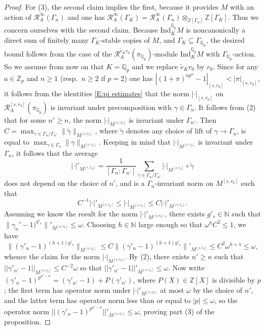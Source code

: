 \documentclass[12pt]{article}
\theoremstyle{definition}
\numberwithin{equation}{theorem}
\newcommand{\calR}{\mathcal{R}}
\newcommand{\QQ}{\mathbb{Q}}
\newcommand{\NN}{\mathbb{N}}
\newcommand{\ZZ}{\mathbb{Z}}
\newcommand{\Ind}{\mathrm{Ind}}
\def\Qp{\QQ_p}
\newcommand{\Zp}{\ZZ_p}
\begin{document}
\begin{proof}
For (3), the second claim implies the first, because it provides $M$
with an action of $\calR_A^\infty(\Gamma_n)$ and one has
$\calR_A^\infty(\Gamma_K) = \calR_A^\infty(\Gamma_n)
\otimes_{\ZZ[\Gamma_n]} \ZZ[\Gamma_K]$.  Thus we concern ourselves
with the second claim.  Because $\Ind_K^{\Qp} M$ is noncanonically a
direct sum of finitely many $\Gamma_K$-stable copies of $M$, and
$\Gamma_K \subseteq \Gamma_{\Qp}$, the desired bound follows from the
case of the $\calR_A^{\tilde e_K r_0}(\pi_{\Qp})$-module $\Ind_K^{\Qp}
M$ with $\Gamma_{\Qp}$-action.  So we assume from now on that $K=\Qp$
and we replace $\tilde e_K r_0$ by $r_0$.  Since for any $a \in \Zp$
and $n \geq 1$ (resp.\ $n \geq 2$ if $p=2$) one has
$|(1+\pi)^{ap^n}-1|_{[s,r_0]} < |\pi|_{[s,r_0]}$, it follows from the
identities \eqref{E:pi estimates} that the norm $|\cdot|_{[s,r_0]}$ on
$\calR_A^{[s,r_0]}(\pi_{\Qp})$ is invariant under precomposition with
$\gamma \in \Gamma_n$.  It follows from (2) that for some $n' \geq n$,
the norm $|\cdot|_{M^{[s,r_0]}}$ is invariant under $\Gamma_{n'}$.
Then $C = \max_{\gamma \in \Gamma_n/\Gamma_{n'}}
\|\tilde\gamma\|_{M^{[s,r_0]}}$, where $\tilde\gamma$ denotes any
choice of lift of $\gamma \to \Gamma_n$, is equal to $\max_{\gamma \in
  \Gamma_n} \|\gamma\|_{M^{[s,r_0]}}$.  Keeping in mind that
$|\cdot|_{M^{[s,r_0]}}$ is invariant under $\Gamma_n$, it follows that
the average
\[
|\cdot|'_{M^{[s,r_0]}}
=
\frac1{[\Gamma_n:\Gamma_{n'}]}
\sum_{\gamma \in \Gamma_n/\Gamma_{n'}} |\cdot|_{M^{[s,r_0]}} \circ \tilde\gamma
\]
does not depend on the choice of $n'$, and is a $\Gamma_n$-invariant
norm on $M^{[s,r_0]}$ such that
\[
C^{-1}|\cdot|'_{M^{[s,r_0]}}
\leq
|\cdot|_{M^{[s,r_0]}}
\leq
C|\cdot|'_{M^{[s,r_0]}}.
\]
Assuming we know the result for the norm $|\cdot|'_{M^{[s,r_0]}}$,
there exists $g'_s \in \NN$ such that
$\|\gamma_n'-1)^{g'_s}\|'_{M^{[s,r_0]}} \leq \omega$.  Choosing $h \in
\NN$ large enough so that $\omega^hC^2 \leq 1$, we have
\[
\|(\gamma'_n-1)^{(h+1)g'_s}\|_{M^{[s,r_0]}}
\leq
C\|(\gamma'_n-1)^{(h+1)g'_s}\|'_{M^{[s,r_0]}}
\leq
C^2\omega^{h+1} \leq \omega,
\]
whence the claim for the norm $|\cdot|_{M^{[s,r_0]}}$.  By (2), there
exists $n' \geq n$ such that $||\gamma'_{n'}-1||_{M^{[s,r_0]}} \leq
C^{-2}\omega$ so that $||\gamma'_{n'}-1||'_{M^{[s,r_0]}} \leq \omega$.
Now write $(\gamma'_n-1)^{p^{n'-n}} = (\gamma'_{n'}-1) +
P(\gamma'_{n'})$, where $P(X) \in \ZZ[X]$ is divisible by $p$; the
first term has operator norm under $|\cdot|'_{M^{[s,r_0]}}$ at most
$\omega$ by the choice of $n'$, and the latter term has operator norm less
than or equal to $|p|\leq \omega$, so the operator norm
$||(\gamma'_{n}-1)^{p^{n'-n}}||'_{M^{[s,r_0]}} \leq \omega$, proving
part (3) of the proposition.
\end{proof}
\end{document}

